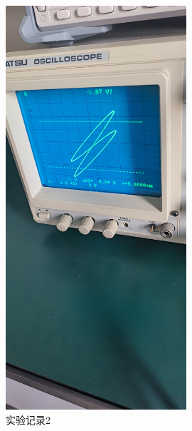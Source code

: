 \documentclass{ctexart}
\begin{document}
\begin{figure}[H]
  \centering
  \includegraphics[width=0.6\textwidth,height=0.2\textheight]{shiyanjilu2.jpg}
  \caption{实验记录2}
\end{figure}
\end{document}
